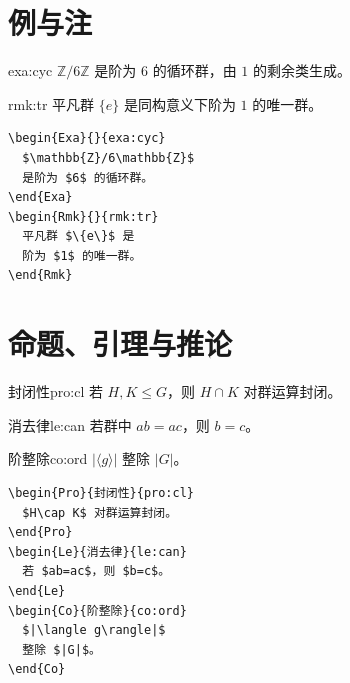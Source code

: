 \section{例与注}

\begin{fullwidth}
\begin{minipage}[t]{0.48\linewidth}
\begin{Exa}{}{exa:cyc}
$\mathbb{Z}/6\mathbb{Z}$ 是阶为 $6$ 的循环群，由 $1$ 的剩余类生成。
\end{Exa}
\begin{Rmk}{}{rmk:tr}
平凡群 $\{e\}$ 是同构意义下阶为 $1$ 的唯一群。
\end{Rmk}
\end{minipage}\hfill
\begin{minipage}[t]{0.48\linewidth}
\begin{lstlisting}[language={[LaTeX]TeX}]
\begin{Exa}{}{exa:cyc}
  $\mathbb{Z}/6\mathbb{Z}$
  是阶为 $6$ 的循环群。
\end{Exa}
\begin{Rmk}{}{rmk:tr}
  平凡群 $\{e\}$ 是
  阶为 $1$ 的唯一群。
\end{Rmk}
\end{lstlisting}
\end{minipage}
\end{fullwidth}

\section{命题、引理与推论}

\begin{fullwidth}
\begin{minipage}[t]{0.48\linewidth}
\begin{Pro}{封闭性}{pro:cl}
若 $H,K\le G$，则 $H\cap K$ 对群运算封闭。
\end{Pro}
\begin{Le}{消去律}{le:can}
若群中 $ab=ac$，则 $b=c$。
\end{Le}
\begin{Co}{阶整除}{co:ord}
$|\langle g\rangle|$ 整除 $|G|$。
\end{Co}
\end{minipage}\hfill
\begin{minipage}[t]{0.48\linewidth}
\begin{lstlisting}[language={[LaTeX]TeX}]
\begin{Pro}{封闭性}{pro:cl}
  $H\cap K$ 对群运算封闭。
\end{Pro}
\begin{Le}{消去律}{le:can}
  若 $ab=ac$，则 $b=c$。
\end{Le}
\begin{Co}{阶整除}{co:ord}
  $|\langle g\rangle|$
  整除 $|G|$。
\end{Co}
\end{lstlisting}
\end{minipage}
\end{fullwidth}

